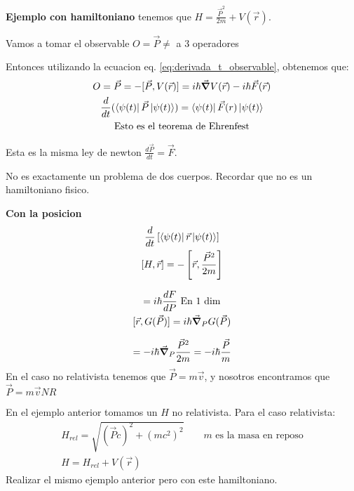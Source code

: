 \documentclass{article}
\newcommand{\caja}[3]{%
  \begin{tcolorbox}[colback=#1!5!white,colframe=#1!25!black,title=#2]
    #3
  \end{tcolorbox}%
}
\begin{document}
\textbf{Ejemplo con hamiltoniano } tenemos que $ H = \frac{\vec P ^2}{2m } + V(\vec r ) $. 

Vamos a tomar el observable $ O = \vec P  \neq $  a 3 operadores

Entonces utilizando la ecuacion eq. \ref{eq:derivada_t_observable}, obtenemos que: 
\begin{gather*}
  O = \vec P = -[\vec P , V(\vec r)] = i \hbar \vec \grad V(\vec r) - i \hbar \vec F(\vec r)\\
  \frac{d  }{d t } (\bra{\psi(t) } \vec P \ket{\psi(t) }) = \bra{\psi(t)}\vec F (r)\ket{\psi(t) } \\
  \text{Esto es el teorema de Ehrenfest}
\end{gather*}

Esta es la misma ley de newton $ \frac{d \vec P  }{d t } = \vec F  $.

No es exactamente un problema de dos cuerpos. Recordar que no es un hamiltoniano fisico. 

\textbf{Con la posicion }
\begin{gather*}
  \frac{d  }{d t } \left[\bra{\psi(t) }\vec r \ket{\psi(t) } \right]\\
  [H, \vec r] = - \left[\vec r , \frac{\vec P ^2}{2m } \right]
\end{gather*}
\caja{black}{}{
  \begin{gather*}
    [x,F(P)]  = i \hbar \frac{d F }{d P } \text{ En 1 dim}\\
    [\vec r, G(\vec P )] = i \hbar \vec \grad _{P } G(\vec P)
  \end{gather*}

}
\begin{gather*}
  [H,\vec r] = -i \hbar \vec \grad _{P } \frac{\vec P ^2}{2m } = -i \hbar \frac{\vec P }{m } 
\end{gather*}
En el caso no relativista tenemos que $ \vec P = m \vec v $, y nosotros encontramos que $ \vec P  = m \vec v N R $

\caja{black}{Ejercicio para profundizar }{
  En el ejemplo anterior tomamos un $ H  $ no relativista. Para el caso relativista: 
  \begin{gather*}
    H _{rel }  = \sqrt{(\vec P c )^2 + (m c ^2)^2}  \qquad m \text{ es la masa en reposo}\\
    H = H _{rel }  + V(\vec r )
  \end{gather*}
  Realizar el mismo ejemplo anterior pero con este hamiltoniano.
}
\end{document}
